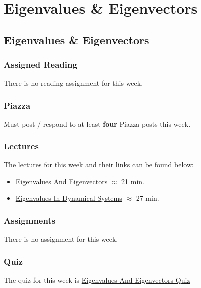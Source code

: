 \clearpage

\renewcommand{\ChapTitle}{Eigenvalues \& Eigenvectors}
\renewcommand{\SectionTitle}{Eigenvalues \& Eigenvectors}

\chapter{\ChapTitle}
\section{\SectionTitle}

\subsection{Assigned Reading}

There is no reading assignment for this week.

\subsection{Piazza}

Must post / respond to at least \textbf{four} Piazza posts this week.  

\subsection{Lectures}

The lectures for this week and their links can be found below:

\begin{itemize}
    \item \href{https://applied.cs.colorado.edu/mod/hvp/view.php?id=50826}{Eigenvalues And Eigenvectors} $\approx$ 21 min.
    \item \href{https://applied.cs.colorado.edu/mod/hvp/view.php?id=50827}{Eigenvalues In Dynamical Systems} $\approx$ 27 min.
\end{itemize}

\subsection{Assignments}

There is no assignment for this week.

\subsection{Quiz}

The quiz for this week is \href{https://applied.cs.colorado.edu/mod/quiz/view.php?id=52237}{Eigenvalues And Eigenvectors Quiz}  